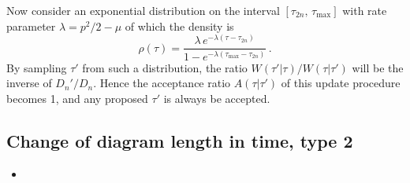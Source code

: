 Now consider an exponential distribution on the interval $ [\tau_{2n}, \, \tau_\text{max}] $ with rate parameter $ \lambda = p^2/2 - \mu $ of which the density is
\begin{equation}
	\rho(\tau) = \frac{\lambda \, e^{-\lambda (\tau - \tau_{2n})}}{1 - e^{- \lambda (\tau_\text{max} - \tau_{2n})}} \,.
\end{equation}
By sampling $ \tau' $ from such a distribution, the ratio $ W(\tau' | \tau)/W(\tau | \tau') $ will be the inverse of $ D_n'/D_n $. Hence the acceptance ratio $ A(\tau | \tau') $ of this update procedure becomes 1, and any proposed $ \tau' $ is always be accepted.

\subsection*{Change of diagram length in time, type 2}

\begin{itemize}
	\item {}
\end{itemize}

